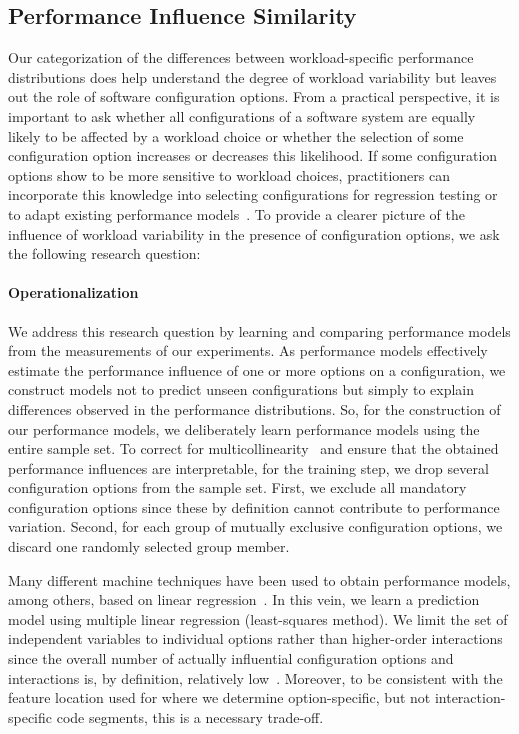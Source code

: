 \subsection{Performance Influence Similarity}\label{sec:rq2}
Our categorization of the differences between workload-specific performance distributions does help understand the degree of workload variability but leaves out the role of software configuration options. From a practical perspective, it is important to ask whether all configurations of a software system are equally likely to be affected by a workload choice or whether the selection of some configuration option increases or decreases this likelihood. If some configuration options show to be more sensitive to workload choices, practitioners can incorporate this knowledge into selecting configurations for regression testing or to adapt existing performance models~\cite{jamshidi_learning_2018}. To provide a clearer picture of the influence of workload variability in the presence of configuration options, we ask the following research question:


\paragraph*{Operationalization}
We address this research question by learning and comparing performance models from the measurements of our experiments. As performance models effectively estimate the performance influence of one or more options on a configuration, we construct models not to predict unseen configurations but simply to explain differences observed in the performance distributions. So, for the construction of our performance models, we deliberately learn performance models using the entire sample set. 
{\color{blue}To correct for multicollinearity~\cite{Daoud_2017} and ensure that the obtained performance influences are interpretable, for the training step, we drop several configuration options from the sample set. First, we exclude all mandatory configuration options since these by definition cannot contribute to performance variation. Second, for each group of mutually exclusive configuration options, we discard one randomly selected group member.}

{\color{blue}
Many different machine techniques have been used to obtain performance models, among others, based on linear regression~\cite{perLasso,siegmundPerformanceinfluenceModelsHighly2015,dorn2020}. In this vein, we learn a prediction model using multiple linear regression (least-squares method). We limit the set of independent variables to individual options rather than higher-order interactions since the overall number of actually influential configuration options and interactions is, by definition, relatively low~\cite{saltelli}. Moreover, to be consistent with the feature location used for  where we determine option-specific, but not interaction-specific code segments, this is a necessary trade-off.
}

